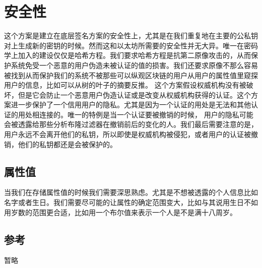 \documentclass[UTF8]{ctexart}
\begin{document}
\section{安全性}
这个方案是建立在底层签名方案的安全性上，尤其是在我们重复地在主要的公私钥对上生成新的密钥的时候。然而这和以太坊所需要的安全性并无大异。唯一在密码学上加入的建设仅仅是哈希方程。我们要求哈希方程是抗第二原像攻击的，从而保护系统免受一个恶意的用户伪造未被认证的值的损害。我们还要求原像不那么容易被找到从而保护我们的系统不被那些可以纵观区块链的用户从用户的属性值里窥探用户的信息，比如可以从树的叶子的摘要反推。
这个方案假设权威机构没有被破坏，但是它会防止一个恶意用户伪造认证或是改变从权威机构获得的认证。这个方案进一步保护了一个信用用户的隐私。尤其是因为一个认证的用处是无法和其他认证的用处相连接的。唯一的特例是当一个认证要被撤销的时候， 用户的隐私可能会被透露给那些分析布隆过滤器在撤销前后的变化的人。我们最后需要注意的是，用户永远不会离开他们的私钥，所以即使是权威机构被侵犯，或者用户的认证被撤销，他们的私钥都还是会被保护的。
\subsection{属性值}
当我们在存储属性值的时候我们需要深思熟虑。尤其是不想被透露的个人信息比如名字或者生日。我们需要尽可能的让属性的确定范围变大，比如与其说用生日不如用岁数的范围更合适，比如用一个布尔值来表示一个人是不是满十八周岁。

\subsection*{参考}
暂略
\end{document}
